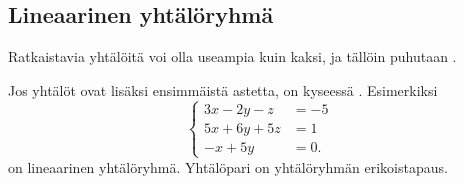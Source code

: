 \subsection*{Lineaarinen yhtälöryhmä}

Ratkaistavia yhtälöitä voi olla useampia kuin kaksi, ja tällöin puhutaan .

Jos yhtälöt ovat lisäksi ensimmäistä astetta, on kyseessä .
Esimerkiksi
\[
\left\{
\begin{aligned}
3x-2y-z&= -5 \\
5x+6y+5z&= 1 \\
-x+5y&= 0.
\end{aligned}
\right.
\]
on lineaarinen yhtälöryhmä. Yhtälöpari on yhtälöryhmän erikoistapaus.



